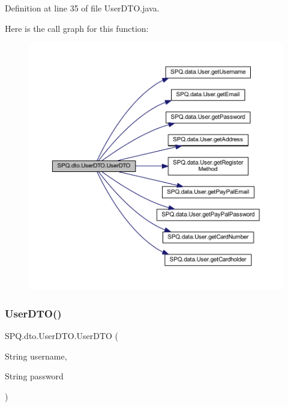 Definition at line 35 of file User\+D\+T\+O.\+java.

Here is the call graph for this function\+:
\nopagebreak
\begin{figure}[H]
\begin{center}
\leavevmode
\includegraphics[width=350pt]{class_s_p_q_1_1dto_1_1_user_d_t_o_a40cad7b1dea2117ed4cb0e69fdc6b929_cgraph}
\end{center}
\end{figure}
\mbox{\label{class_s_p_q_1_1dto_1_1_user_d_t_o_ad73df6daa2dd8fc4615a5b154acc229b}} 
\subsubsection{\texorpdfstring{User\+D\+T\+O()}{UserDTO()}\hspace{0.1cm}{\footnotesize\ttfamily [8/11]}}
{\footnotesize\ttfamily S\+P\+Q.\+dto.\+User\+D\+T\+O.\+User\+D\+TO (\begin{DoxyParamCaption}\item[{String}]{username,  }\item[{String}]{password }\end{DoxyParamCaption})}


